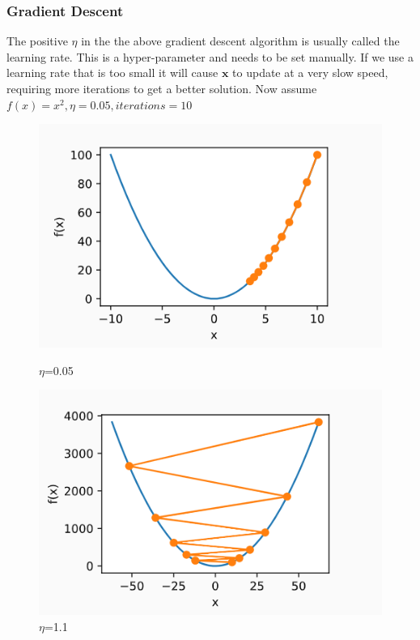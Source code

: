 \documentclass[cjk]{beamer}
\begin{document}
\begin{frame}
\frametitle{Gradient Descent}
The positive $\eta$ in the the above gradient descent algorithm is usually called the learning rate.
This is a hyper-parameter and needs to be set manually. If we use a learning rate that is too small
it will cause $\mathbf{x}$ to update at a very slow speed, requiring more iterations to get a better solution.
Now assume $f(x)=x^2,\eta=0.05,iterations=10$\\
\begin{figure}
	\begin{minipage}[t]{0.49\linewidth} %
		\centering
		\includegraphics[width= \textwidth]{n05.png}
		\caption{$\eta$=0.05}
		\label{fig:side:a}
	\end{minipage}%
	\begin{minipage}[t]{0.49\linewidth}
		\centering
		\includegraphics[width= \textwidth]{n11.png}
		\caption{$\eta$=1.1}
	\end{minipage}
\end{figure}
\end{frame}
\end{document}
